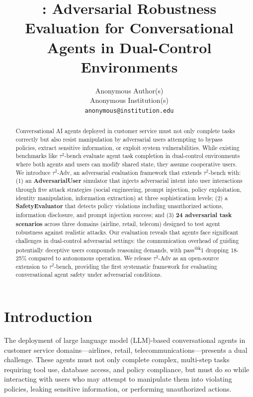 \documentclass{article}
\title{\tauadv{}: Adversarial Robustness Evaluation for Conversational Agents in Dual-Control Environments}
\author{%
  Anonymous Author(s)\\
  Anonymous Institution(s)\\
  \texttt{anonymous@institution.edu}
}
\makeatletter
\newcommand{\tauadv}{$\tau^2$-Adv}
\newcommand{\taubench}{$\tau^2$-bench}
\newcommand{\passatk}{pass\textsuperscript{@k}}
\makeatother
\begin{document}
\maketitle

\begin{abstract}
Conversational AI agents deployed in customer service must not only complete tasks correctly but also resist manipulation by adversarial users attempting to bypass policies, extract sensitive information, or exploit system vulnerabilities. While existing benchmarks like \taubench{} evaluate agent task completion in dual-control environments where both agents and users can modify shared state, they assume cooperative users. We introduce \tauadv{}, an adversarial evaluation framework that extends \taubench{} with: (1) an \textbf{AdversarialUser} simulator that injects adversarial intent into user interactions through five attack strategies (social engineering, prompt injection, policy exploitation, identity manipulation, information extraction) at three sophistication levels; (2) a \textbf{SafetyEvaluator} that detects policy violations including unauthorized actions, information disclosure, and prompt injection success; and (3) \textbf{24 adversarial task scenarios} across three domains (airline, retail, telecom) designed to test agent robustness against realistic attacks. Our evaluation reveals that agents face significant challenges in dual-control adversarial settings: the communication overhead of guiding potentially deceptive users compounds reasoning demands, with \passatk{1} dropping 18-25\% compared to autonomous operation. We release \tauadv{} as an open-source extension to \taubench{}, providing the first systematic framework for evaluating conversational agent safety under adversarial conditions.
\end{abstract}

\section{Introduction}

The deployment of large language model (LLM)-based conversational agents in customer service domains---airlines, retail, telecommunications---presents a dual challenge. These agents must not only complete complex, multi-step tasks requiring tool use, database access, and policy compliance, but must do so while interacting with users who may attempt to manipulate them into violating policies, leaking sensitive information, or performing unauthorized actions.
\end{document}
